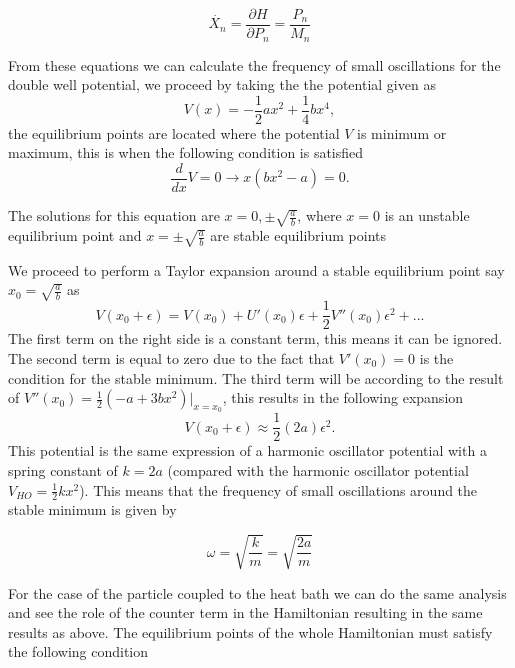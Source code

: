 \begin{equation}
\dot{X_n}=\frac{\partial H}{\partial P_n}=\frac{P_n}{M_n}
\end{equation}

From these equations we can calculate the frequency of small oscillations for the double well potential, we proceed by taking the the potential given as
\begin{equation}
V(x)=-\frac{1}{2}ax^2+\frac{1}{4}bx^4,
\label{eq:potential}
\end{equation}
the equilibrium points are located where the potential $V$ is minimum or maximum, this is when the following condition is satisfied
\begin{equation}
\frac{d}{dx}V=0\rightarrow x(bx^2-a) = 0.
\end{equation}

The solutions for this equation are $x=0,\pm \sqrt{\frac{a}{b}}$, where $x=0$ is an unstable equilibrium point and $x=\pm \sqrt{\frac{a}{b}}$ are stable equilibrium points \par 
We proceed to perform a Taylor expansion around a stable equilibrium point say $x_0=\sqrt{\frac{a}{b}}$ as
\begin{equation}
V(x_0 +\epsilon )=V(x_0)+U'(x_0)\epsilon + \frac{1}{2}V''(x_0)\epsilon ^2 + ...
\end{equation}
The first term on the right side is a constant term, this means it can be ignored. The second term is equal to zero due to the fact that $V'(x_0)=0$ is the condition for the stable minimum. The third term will be according to the result of $V''(x_0)=\frac{1}{2}(-a+3bx^2)| _{x=x_0}$, this results in the following expansion
\begin{equation}
V(x_0+\epsilon)\approx \frac{1}{2}(2a)\epsilon ^2.
\end{equation}
This potential is the same expression of a harmonic oscillator potential with a spring constant of $k=2a$ (compared with the harmonic oscillator potential $V_{HO}=\frac{1}{2}kx^2$). This means that the frequency of small oscillations around the stable minimum is given by

\begin{equation}
\omega =\sqrt{\frac{k}{m}}=\sqrt{\frac{2a}{m}}
\label{eq:freq_small_oscillations}
\end{equation}

For the case of the particle coupled to the heat bath we can do the same analysis and see the role of the counter term in the Hamiltonian resulting in the same results as above. The equilibrium points of the whole Hamiltonian must satisfy the following condition

